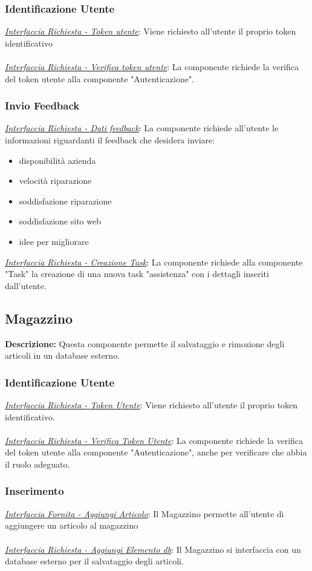 \documentclass{report}
\begin{document}
\subsubsection*{\indent \indent Identificazione Utente}
\uline{\textit{Interfaccia Richiesta - Token utente}}: 
Viene richiesto all'utente il proprio token identificativo\\ \\
\uline{\textit{Interfaccia Richiesta - Verifica token utente}}:
La componente richiede la verifica del token utente alla componente "Autenticazione".
\subsubsection*{\indent \indent Invio Feedback}
\uline{\textit{Interfaccia Richiesta - Dati feedback}}:
La componente richiede all'utente le informazioni riguardanti il feedback che desidera inviare:
\begin{itemize}
	\item disponibilità azienda
	\item velocità riparazione
	\item soddisfazione riparazione
	\item soddisfazione sito web
	\item idee per migliorare
\end{itemize}
\uline{\textit{Interfaccia Richiesta - Creazione Task}}:
La componente richiede alla componente "Task" la creazione di una nuova task "assistenza" con i dettagli inseriti dall'utente.

\subsection*{Magazzino}
\textbf{Descrizione: } Questa componente permette il salvataggio e rimozione degli articoli in un database esterno.
\subsubsection*{ \indent \indent Identificazione Utente}
\uline{\textit{Interfaccia Richiesta - Token Utente}}:
Viene richiesto all'utente il proprio token identificativo.\\ \\
\uline{\textit{Interfaccia Richiesta - Verifica Token Utente}}: 
La componente richiede la verifica del token utente alla componente "Autenticazione", anche per verificare che abbia il ruolo adeguato.
\subsubsection*{\indent \indent Inserimento}
\uline{\textit{Interfaccia Fornita - Aggiungi Articolo}}:
Il Magazzino permette all'utente di aggiungere un articolo al magazzino  \\ \\%
\uline{\textit{Interfaccia Richiesta - Aggiungi Elemento db}}:
Il Magazzino si interfaccia con un database esterno per il salvataggio degli articoli.
\end{document}
